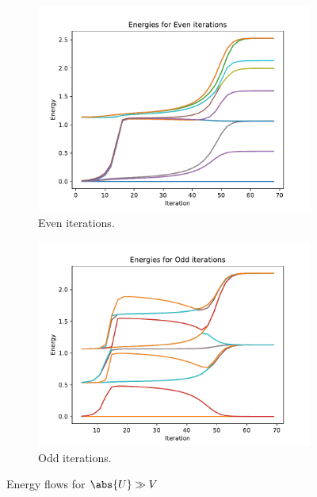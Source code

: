 \begin{figure}
  \centering
  \begin{subfigure}[b]{0.4\linewidth}
    \centering
    \includegraphics[width=\linewidth]{./gfx/results/even.pdf}
    \caption{Even iterations.}
    \label{fig:5-results-energies-a}
  \end{subfigure}
  \begin{subfigure}[b]{0.4\linewidth}
    \centering
    \includegraphics[width=\linewidth]{./gfx/results/odd.pdf}
    \caption{Odd iterations.}
    \label{fig:5-results-energies-b}
  \end{subfigure}
  \caption{Energy flows for $\abs{U} \gg V$}
\end{figure}

